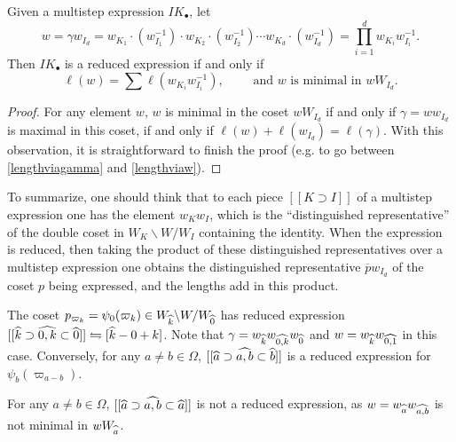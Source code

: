 \begin{lemma} \label{lem:otherreduced} Given a multistep expression $IK_{\bullet}$, let
\begin{equation} w = \gamma w_{I_d} = w_{K_1} \cdot (w_{I_1}^{-1}) \cdot w_{K_2} \cdot (w_{I_2}^{-1}) \cdots w_{K_d} \cdot (w_{I_d}^{-1}) = \prod_{i=1}^d w_{K_i} w_{I_i}^{-1}. \end{equation}
Then $IK_{\bullet}$ is a reduced expression if and only if 
\begin{equation}\label{lengthviaw} \ell(w) = \sum \ell(w_{K_i} w_{I_i}^{-1}), \qquad \textrm{ and $w$ is minimal in } w W_{I_d}. \end{equation} \end{lemma}

\begin{proof} For any element $w$, $w$ is minimal in the coset $w W_{I_d}$ if and only if $\gamma = w w_{I_d}$ is maximal in this coset, if and only if $\ell(w) + \ell(w_{I_d}) = \ell(\gamma)$. With this observation, it is straightforward to finish the proof (e.g. to go between \eqref{lengthviagamma} and \eqref{lengthviaw}). \end{proof}

To summarize, one should think that to each piece $[[K \supset I]]$ of a multistep expression one has the element $w_{K} w_{I}$, which is the ``distinguished representative'' of the double coset in $W_{K} \backslash W / W_{I}$ containing the identity. When the expression is reduced, then taking the product of these distinguished representatives over a multistep expression one obtains the distinguished representative $\overline{p} w_{I_d}$ of the coset $p$ being expressed, and the lengths add in this product.

\begin{example}\label{example rex for fund weights} The coset $p_{\varpi_k} = \psi_0(\varpi_k) \in W_{\widehat{k}} \backslash W / W_{\widehat{0}}$ has reduced expression $[[\widehat{k} \supset \widehat{0,k} \subset \widehat{0}]] \leftrightharpoons [\widehat{k} - 0 + k]$. Note that $\gamma=w_{\widehat{k}}w_{\widehat{0,k}}w_{\widehat{0}}$ and  $w=w_{\widehat{k}}w_{\widehat{0,1}}$ in this case.
Conversely, for any $a \ne b \in \Omega$, $[[\widehat{a} \supset \widehat{a,b} \subset \widehat{b}]]$ is a reduced expression for $\psi_b(\varpi_{a-b})$. \end{example}

\begin{example} For any $a \ne b \in \Omega$, $[[\widehat{a} \supset \widehat{a,b} \subset \widehat{a}]]$ is not a reduced expression, as $w = w_{\widehat{a}} w_{\widehat{a,b}}$ is not minimal in $w W_{\widehat{a}}$. \end{example}


